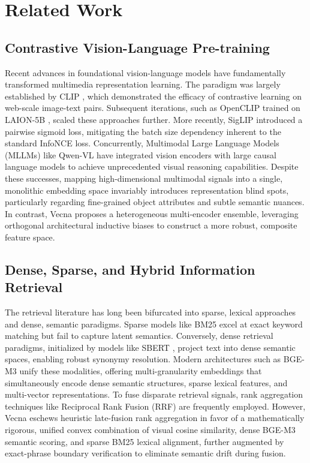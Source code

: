 \section{Related Work}\label{sec:related}

\subsection{Contrastive Vision-Language Pre-training}
Recent advances in foundational vision-language models have fundamentally transformed multimedia representation learning. The paradigm was largely established by CLIP \cite{radford2021learning}, which demonstrated the efficacy of contrastive learning on web-scale image-text pairs. Subsequent iterations, such as OpenCLIP \cite{ilharco2021openclip} trained on LAION-5B \cite{schuhmann2022laion}, scaled these approaches further. More recently, SigLIP \cite{zhai2023sigmoid} introduced a pairwise sigmoid loss, mitigating the batch size dependency inherent to the standard InfoNCE loss. Concurrently, Multimodal Large Language Models (MLLMs) like Qwen-VL \cite{bai2023qwen} have integrated vision encoders with large causal language models to achieve unprecedented visual reasoning capabilities. Despite these successes, mapping high-dimensional multimodal signals into a single, monolithic embedding space invariably introduces representation blind spots, particularly regarding fine-grained object attributes and subtle semantic nuances. In contrast, Vecna proposes a heterogeneous multi-encoder ensemble, leveraging orthogonal architectural inductive biases to construct a more robust, composite feature space.

\subsection{Dense, Sparse, and Hybrid Information Retrieval}
The retrieval literature has long been bifurcated into sparse, lexical approaches and dense, semantic paradigms. Sparse models like BM25 \cite{robertson2009probabilistic} excel at exact keyword matching but fail to capture latent semantics. Conversely, dense retrieval paradigms, initialized by models like SBERT \cite{reimers2019sentence}, project text into dense semantic spaces, enabling robust synonymy resolution. Modern architectures such as BGE-M3 \cite{chen2024bge} unify these modalities, offering multi-granularity embeddings that simultaneously encode dense semantic structures, sparse lexical features, and multi-vector representations. To fuse disparate retrieval signals, rank aggregation techniques like Reciprocal Rank Fusion (RRF) \cite{cormack2009reciprocal} are frequently employed. However, Vecna eschews heuristic late-fusion rank aggregation in favor of a mathematically rigorous, unified convex combination of visual cosine similarity, dense BGE-M3 semantic scoring, and sparse BM25 lexical alignment, further augmented by exact-phrase boundary verification to eliminate semantic drift during fusion.

